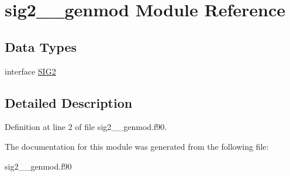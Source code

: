 \hypertarget{classsig2____genmod}{\section{sig2\+\_\+\+\_\+genmod Module Reference}
\label{classsig2____genmod}
}
\subsection*{Data Types}
\begin{DoxyCompactItemize}
\item 
interface \hyperlink{interfacesig2____genmod_1_1_s_i_g2}{S\+I\+G2}
\end{DoxyCompactItemize}


\subsection{Detailed Description}


Definition at line 2 of file sig2\+\_\+\+\_\+genmod.\+f90.



The documentation for this module was generated from the following file\+:\begin{DoxyCompactItemize}
\item 
sig2\+\_\+\+\_\+genmod.\+f90\end{DoxyCompactItemize}
